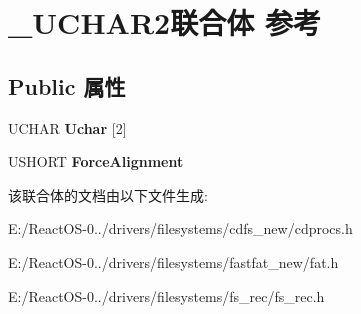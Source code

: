 \hypertarget{union___u_c_h_a_r2}{}\section{\+\_\+\+U\+C\+H\+A\+R2联合体 参考}
\label{union___u_c_h_a_r2}
\subsection*{Public 属性}
\begin{DoxyCompactItemize}
\item 
\mbox{\label{union___u_c_h_a_r2_af6ac2c4b529af116528b6f33588ebd99}} 
U\+C\+H\+AR {\bfseries Uchar} \mbox{[}2\mbox{]}
\item 
\mbox{\label{union___u_c_h_a_r2_ac8a05c87f273c6dadc61a6b1f0b6f3ec}} 
U\+S\+H\+O\+RT {\bfseries Force\+Alignment}
\end{DoxyCompactItemize}


该联合体的文档由以下文件生成\+:\begin{DoxyCompactItemize}
\item 
E\+:/\+React\+O\+S-\/0../drivers/filesystems/cdfs\+\_\+new/cdprocs.\+h\item 
E\+:/\+React\+O\+S-\/0../drivers/filesystems/fastfat\+\_\+new/fat.\+h\item 
E\+:/\+React\+O\+S-\/0../drivers/filesystems/fs\+\_\+rec/fs\+\_\+rec.\+h\end{DoxyCompactItemize}
